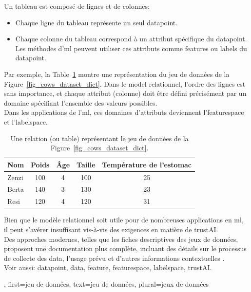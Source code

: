 {{		Un tableau est composé de lignes et de colonnes:
		\begin{itemize}
			\item Chaque ligne du tableau représente un seul \gls{datapoint}.
			\item Chaque colonne du tableau correspond à un attribut spécifique du \gls{datapoint}. 
			Les méthodes d'\gls{ml} peuvent utiliser ces attributs comme \glspl{feature} ou \glspl{label}
			du \gls{datapoint}.
		\end{itemize}
		Par exemple, la Table~\ref{tab:cowdata} montre une représentation du jeu de données de la Figure~\ref{fig_cows_dataset_dict}.
		Dans le \gls{model} relationnel, l’ordre des lignes est sans importance, et chaque attribut 
		(colonne) doit être défini précisément par un domaine spécifiant l’ensemble des valeurs possibles.\\
		Dans les applications de l'\gls{ml}, ces domaines d’attributs deviennent l’\gls{featurespace} 
		et l'\gls{labelspace}.
		\begin{table}[H]
			\centering
			\begin{tabular}{lcccc}
				\hline
				\textbf{Nom} & \textbf{Poids} & \textbf{Âge} & \textbf{Taille} & \textbf{Température de l'estomac} \\
				\hline
				Zenzi & 100 & 4 & 100 & 25 \\
				Berta & 140 & 3 & 130 & 23 \\
				Resi  & 120 & 4 & 120 & 31 \\
				\hline
			\end{tabular}
			\caption{Une relation (ou table) représentant le jeu de données de la Figure~\ref{fig_cows_dataset_dict}.}
			\label{tab:cowdata}
		\end{table}
		Bien que le modèle relationnel soit utile pour de nombreuses applications en \gls{ml}, 
		il peut s’avérer insuffisant vis-à-vis des exigences en matière de \gls{trustAI}.\\
		Des approches modernes, telles que les fiches descriptives des jeux de données, proposent une documentation 
		plus complète, incluant des détails sur le processus de collecte des \gls{data}, l’usage prévu 
		et d’autres informations contextuelles \cite{DatasheetData2021}.
		\\
		Voir aussi: \gls{datapoint}, \gls{data}, \gls{feature}, \gls{featurespace}, \gls{labelspace}, \gls{trustAI}.
	},
	first={jeu de données},
	text={jeu de données},
	plural={jeux de données}
}


